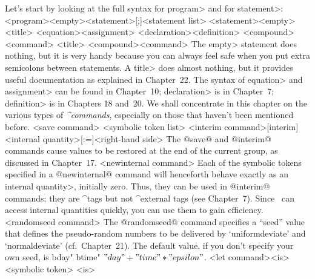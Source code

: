 Let's start by looking at the full syntax for \<program> and for
\<statement>:
\beginsyntax
<program>\is<empty>\alt<statement>[;]<statement list>
<statement>\is<empty>\alt<title>
 \alt<equation>\alt<assignment>
 \alt<declaration>\alt<definition>
 \alt<compound>\alt<command>
<title>
<compound>
<command>
\endsyntax
The \<empty> statement does nothing, but it is very handy because you can
always feel safe when you put extra semicolons between statements.
A \<title> does almost nothing, but it provides useful documentation
as explained in Chapter~22.
The syntax of \<equation> and \<assignment> can be found in Chapter~10;
\<declaration> is in Chapter~7; \<definition> is in Chapters 18 and~20.
We shall concentrate in this chapter on the various types of {\sl
^{commands}}, especially on those that haven't been mentioned before.
\beginsyntax
<save command>
<symbolic token list>
<interim command>\is\kern-1.5pt[interim]%
 <internal quantity>[:=]<right-hand side>\kern-1pt
\endsyntax
The @save@ and @interim@ commands cause values to be restored at the end
of the current group, as discussed in Chapter~17.
\beginsyntax
<newinternal command>
\endsyntax
Each of the symbolic tokens specified in a @newinternal@ command will
henceforth behave exactly as an \<internal quantity>, initially zero.
Thus, they can be used in @interim@ commands; they are ^{tags} but not
^{external tags} (see Chapter~7). Since \MF\ can access internal
quantities quickly, you can use them to gain efficiency.
\beginsyntax
<randomseed command>
\endsyntax
The @randomseed@ command specifies a ``seed'' value that defines
the pseudo-random numbers to be delivered by
`uniformdeviate' and `normaldeviate' (cf.~Chapter~21).
The default value, if you don't specify your own seed, is
^^"day" ^^"time" $"day"+"time"\ast"epsilon"$.
\beginsyntax
<let command><is><symbolic token>
<is>\is[=]\alt[:=]
